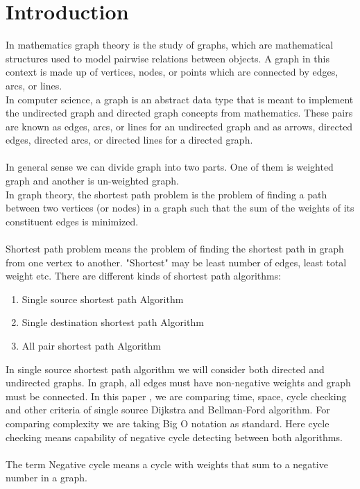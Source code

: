 \documentclass[a4paper,10pt]{article}
\begin{document}
\section{Introduction}
In mathematics graph theory is the study of graphs, which are mathematical structures used to model pairwise relations between objects. A graph in this context is made up of vertices, nodes, or points which are connected by edges, arcs, or lines.\\
In computer science, a graph is an abstract data type that is meant to implement the undirected graph and directed graph concepts from mathematics. These pairs are known as edges, arcs, or lines for an undirected graph and as arrows, directed edges, directed arcs, or directed lines for a directed graph.~\cite{re1}
\\\\
In general sense we can divide graph into two parts. One of them is weighted graph and another is un-weighted graph.
\\
In graph theory, the shortest path problem is the problem of finding a path between two vertices (or nodes) in a graph such that the sum of the weights of its constituent edges is minimized.~\cite{re2}
\\\\
Shortest path problem means the problem of finding the shortest path in graph from one vertex to another. "Shortest" may be least number of edges, least total weight etc. There are different kinds of shortest path algorithms:\\
\begin{enumerate}
  \item Single source shortest path Algorithm
  \item Single destination shortest path Algorithm
  \item All pair shortest path Algorithm
\end{enumerate}
In single source shortest path algorithm we will consider both directed and undirected graphs. In graph, all edges must have non-negative weights and graph must be connected. In this paper , we are comparing time, space, cycle checking and other criteria of single source Dijkstra and Bellman-Ford algorithm. For comparing complexity we are taking Big O notation as standard. Here cycle checking means capability of negative cycle detecting between both algorithms.
\\\\
The term Negative cycle means a cycle with weights that sum to a negative number in a graph.~\cite{re3}\\
\end{document}
